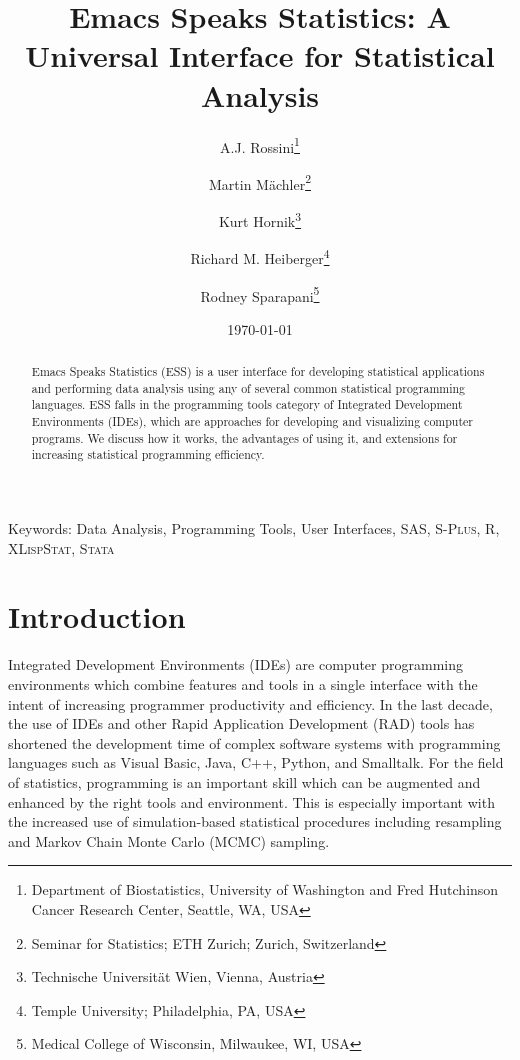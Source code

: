 \documentclass{article}
\title{Emacs Speaks Statistics: A Universal Interface for
  Statistical Analysis}
\author{A.J. Rossini\footnote{Department of Biostatistics, University
    of Washington and Fred Hutchinson Cancer Research Center, Seattle,
    WA, USA} \and Martin M{\"a}chler\footnote{Seminar for Statistics;
    ETH Zurich; Zurich, Switzerland} \and Kurt
  Hornik\footnote{Technische Universit{\"a}t Wien, Vienna, Austria}
  \and Richard M. Heiberger\footnote{Temple University; Philadelphia,
    PA, USA} \and Rodney Sparapani\footnote{Medical College of
    Wisconsin, Milwaukee, WI, USA}}
\date{\today}
\newif\ifpdf
\newcommand*{\Splus}{\textsc{S-Plus}}
\newcommand*{\XLispStat}{\textsc{XLispStat}}
\newcommand*{\Stata}{\textsc{Stata}}
\begin{document}
\ifpdf
  \DeclareGraphicsExtensions{.jpg,.pdf,.png,.mps}
\fi


\singlespace

\maketitle

Keywords: Data Analysis, Programming Tools, User Interfaces, SAS,
\Splus, R, \XLispStat, \Stata

\begin{abstract}
  Emacs Speaks Statistics (ESS) is a user interface for developing
  statistical applications and performing data analysis using any of
  several common statistical programming languages.  ESS falls in the
  programming tools category of Integrated Development Environments
  (IDEs), which are approaches for developing and visualizing computer
  programs.  We discuss how it works, the advantages of using it, and
  extensions for increasing statistical programming efficiency.
\end{abstract}

\doublespace

\section{Introduction}
\label{sec:intro}

Integrated Development Environments (IDEs) are computer programming
environments which combine features and tools in a single interface
with the intent of increasing programmer productivity and efficiency.
In the last decade, the use of IDEs and other Rapid Application
Development (RAD) tools has shortened the development time of complex
software systems with programming languages such as Visual Basic,
Java, C++, Python, and Smalltalk.  For the field of statistics,
programming is an important skill which can be augmented and enhanced
by the right tools and environment.  This is especially important with
the increased use of simulation-based statistical procedures including
resampling and Markov Chain Monte Carlo (MCMC) sampling.
\end{document}
